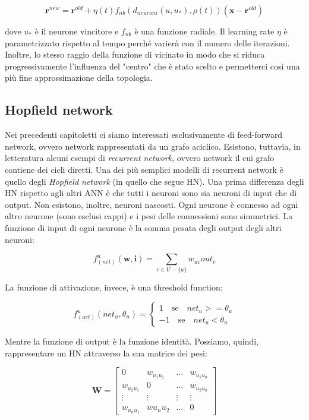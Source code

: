 \documentclass[10pt,a4paper]{article}
\newcommand{\ww}{\mathbf{w}}
\newcommand{\ii}{\mathbf{i}}
\begin{document}
$$
\mathbf{r}^{new} = \mathbf{r}^{old} + \eta(t)f_{nb}(d_{neuroni}(u,u_*),\rho(t))(\mathbf{x} - \mathbf{r}^{old})
$$

dove $u_*$ è il neurone vincitore e $f_{nb}$ è una funzione radiale. Il learning rate $\eta$ è parametrizzato rispetto al tempo perché varierà con il numero delle iterazioni. Inoltre, lo stesso raggio della funzione di vicinato in modo che si riduca progressivamente l'influenza del "centro" che è stato scelto e permetterci così una più fine approssimazione della topologia.

\subsection{Hopfield network}

Nei precedenti capitoletti ci siamo interessati esclusivamente di feed-forward network, ovvero network rappresentati da un grafo aciclico. Esistono, tuttavia, in letteratura alcuni esempi di \emph{recurrent network}, ovvero network il cui grafo contiene dei cicli diretti. Una dei più semplici modelli di recurrent network è quello degli \emph{Hopfield network} (in quello che segue HN). Una prima differenza degli HN rispetto agli altri ANN è che tutti i neuroni sono sia neuroni di input che di output. Non esistono, inoltre, neuroni nascosti. Ogni neurone è connesso ad ogni altro neurone (sono esclusi cappi) e i pesi delle connessioni sono simmetrici. La funzione di input di ogni neurone è la somma pesata degli output degli altri neuroni:

$$
f_{(net)}^u(\ww,\ii) = \sum_{v \in U - \{u\}} w_{uv} out_v 
$$

La funzione di attivazione, invece, è una threshold function:

$$
f_{(act)}^u(net_u,\theta_u) = \begin{cases}
				1 \quad \text{se} \quad net_u >= \theta_u \\
				-1 \quad \text{se} \quad net_u < \theta_u
							  \end{cases}
$$

Mentre la funzione di output è la funzione identità. Possiamo, quindi, rappresentare un HN attraverso la sua matrice dei pesi:

$$
\mathbf{W} = \begin{bmatrix} 
			0 & w_{u_1 u_2} & \dots & w_{u_1 u_n} \\
			w_{u_2 u_1} & 0 & \dots & w_{u_2 u_n} \\
			\vdots & \vdots & \vdots & \vdots \\
			w_{u_n u_1} & w{u_n u_2} & \dots & 0
			\end{bmatrix}
$$
\end{document}
